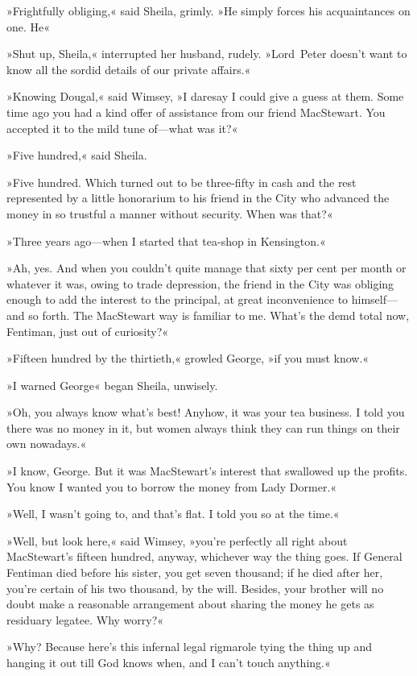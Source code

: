 »Frightfully obliging,« said Sheila, grimly. »He simply forces his acquaintances on one. He\longdash«

»Shut up, Sheila,« interrupted her husband, rudely. »Lord~Peter doesn't want to know all the sordid details of our private affairs.«

»Knowing Dougal,« said Wimsey, »I daresay I could give a guess at them. Some time ago you had a kind offer of assistance from our friend MacStewart. You accepted it to the mild tune of—what was it?«

»Five hundred,« said Sheila.

»Five hundred. Which turned out to be three-fifty in cash and the rest represented by a little honorarium to his friend in the City who advanced the money in so trustful a manner without security. When was that?«

»Three years ago—when I started that tea-shop in Kensington.«

»Ah, yes. And when you couldn't quite manage that sixty per cent per month or whatever it was, owing to trade depression, the friend in the City was obliging enough to add the interest to the principal, at great inconvenience to himself—and so forth. The MacStewart way is familiar to me. What's the demd total now, Fentiman, just out of curiosity?«

»Fifteen hundred by the thirtieth,« growled George, »if you must know.«

»I warned George\longdash« began Sheila, unwisely.

»Oh, you always know what's best! Anyhow, it was your tea business. I told you there was no money in it, but women always think they can run things on their own nowadays.«

»I know, George. But it was MacStewart's interest that swallowed up the profits. You know I wanted you to borrow the money from Lady Dormer.«

»Well, I wasn't going to, and that's flat. I told you so at the time.«

»Well, but look here,« said Wimsey, »you're perfectly all right about MacStewart's fifteen hundred, anyway, whichever way the thing goes. If General Fentiman died before his sister, you get seven thousand; if he died after her, you're certain of his two thousand, by the will. Besides, your brother will no doubt make a reasonable arrangement about sharing the money he gets as residuary legatee. Why worry?«

»Why? Because here's this infernal legal rigmarole tying the thing up and hanging it out till God knows when, and I can't touch anything.«

